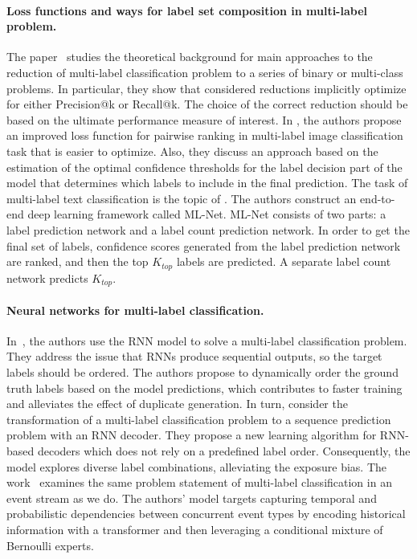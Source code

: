 \documentclass[runningheads]{llncs}
\begin{document}


\paragraph{\textbf{Loss functions and ways for label set composition in multi-label problem.}}
The paper~\cite{menon2019multilabel} studies the theoretical background for main approaches to the reduction of multi-label classification problem to a series of binary or multi-class problems. In particular, they show that considered reductions implicitly optimize for either Precision@k or Recall@k. The choice of the correct reduction should be based on the ultimate performance measure of interest. In \cite{Li_2017_CVPR}, the authors propose an improved loss function for pairwise ranking in multi-label image classification task that is easier to optimize. Also, they discuss an approach based on the estimation of the optimal confidence thresholds for the label decision part of the model that determines which labels to include in the final prediction. The task of multi-label text classification is the topic of \cite{du2019ml}.
The authors construct an end-to-end deep learning framework called ML-Net. ML-Net consists of two parts: a label prediction network and a label count prediction network. In order to get the final set of labels, confidence scores generated from the label prediction network are ranked, and then the top $K_{top}$ labels are predicted. A separate label count network predicts $K_{top}$. 

\paragraph{\textbf{Neural networks for multi-label classification.}}
In~\cite{yazici2020orderless}, the authors use the RNN model to solve a multi-label classification problem. They address the issue that RNNs produce sequential outputs, so the target labels should be ordered. The authors propose to dynamically order the ground truth labels based on the model predictions, which contributes to faster training and alleviates the effect of duplicate generation. In turn, \cite{tsai2020order} consider the transformation of a multi-label classification problem to a sequence prediction problem with an RNN decoder. They propose a new learning algorithm for RNN-based decoders which does not rely on a predefined label order. Consequently, the model explores diverse label combinations, alleviating the exposure bias. 
The work~\cite{shou2023concurrent} examines the same problem statement of multi-label classification in an event stream as we do. The authors' model targets capturing temporal and probabilistic dependencies between concurrent event types by encoding historical information with a transformer and then leveraging a conditional mixture of Bernoulli experts.
\end{document}
